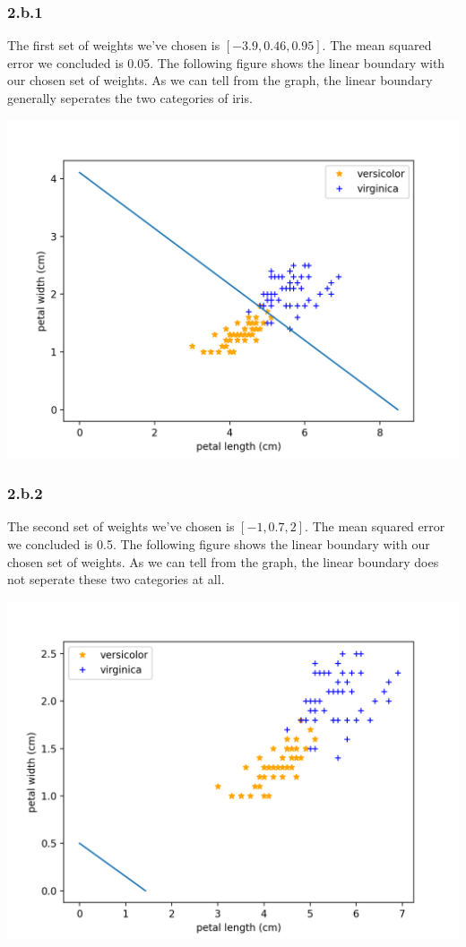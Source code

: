 \documentclass[12pt]{article}
\begin{document}
\subsubsection*{2.b.1}
The first set of weights we've chosen is $[-3.9, 0.46, 0.95]$. The mean squared error we concluded is 0.05. The following figure shows the linear boundary with our chosen set of weights. As we can tell from the graph, the
linear boundary generally seperates the two categories of iris. 
\begin{center}
    \includegraphics[scale=0.6]{fig/p2_b1.png}
\end{center}

\subsubsection*{2.b.2}
The second set of weights we've chosen is $[-1, 0.7, 2]$. The mean squared error we concluded is 0.5. The following figure shows the linear boundary with our chosen set of weights. As we can tell from the graph, the linear boundary does not seperate these two categories 
at all. 
\begin{center}
    \includegraphics[scale=0.6]{fig/p2_b2.png}
\end{center}
\end{document}
